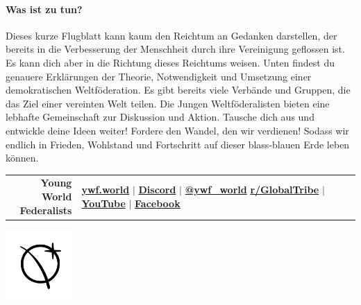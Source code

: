 \documentclass[11pt,a4paper]{article}
\begin{document}
\paragraph{Was ist zu tun?}

Dieses kurze Flugblatt kann kaum den Reichtum an Gedanken darstellen, der bereits in die Verbesserung der Menschheit durch ihre Vereinigung geflossen ist.
Es kann dich aber in die Richtung dieses Reichtums weisen.
Unten findest du genauere Erklärungen der Theorie, Notwendigkeit und Umsetzung einer demokratischen Weltföderation. Es gibt bereits viele Verbände und Gruppen, die das Ziel einer vereinten Welt teilen.
Die Jungen Weltföderalisten bieten eine lebhafte Gemeinschaft zur Diskussion und Aktion.
Tausche dich aus und entwickle deine Ideen weiter!
Fordere den Wandel, den wir verdienen!
Sodass wir endlich in Frieden, Wohlstand und Fortschritt auf dieser blass-blauen Erde leben können.
\vspace{11pt}
\hline

\begin{multicols}{2}
\nocite{*}
\begingroup
{}
\setlength\bibitemsep{2pt}
\printbibliography[heading=none]
\endgroup
\end{multicols}

\begin{minipage}{.75\textwidth}
\begin{shaded*}
\begin{tabular}{r|l}
\makecell[r]{\large{\textbf{Young World}}\\ \large{\textbf{Federalists}}} & \makecell[l]{\textbf{\href{https://www.ywf.world}{ywf.world}} $\mid$ \textbf{\href{https://discord.gg/WyUkQps}{Discord}} $\mid$ \textbf{\href{https://twitter.com/ywf_world}{@ywf\_world}}\\  
\textbf{\href{https://www.reddit.com/r/GlobalTribe/}{r/GlobalTribe}} $\mid$ \textbf{\href{https://www.youtube.com/channel/UCBWca8XnMHF9EELWbz146pg}{YouTube}} $\mid$ \textbf{\href{https://www.facebook.com/YoungWorldFederalists/}{Facebook}}}
\end{tabular}

\end{shaded*}
\end{minipage}%
\begin{minipage}{0.25\textwidth}
\vspace{-30pt}
    \centering
    \includegraphics[height=100px]{ywf.png}

\end{minipage}
\end{document}
